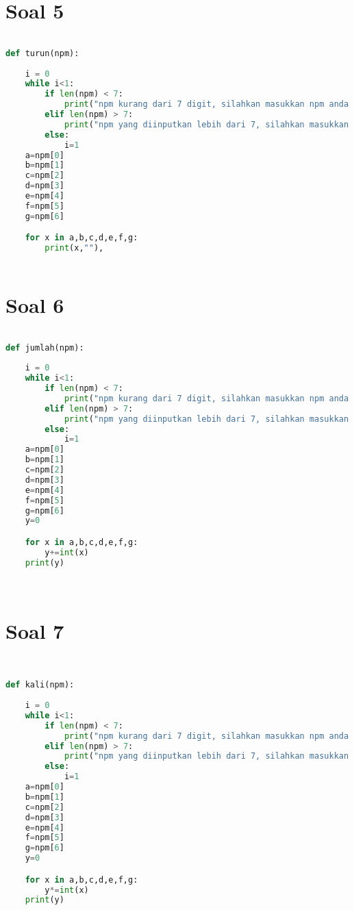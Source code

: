 \section*{Soal 5}
\begin{lstlisting}[language=Python]

def turun(npm):
    
    i = 0
    while i<1:
        if len(npm) < 7:
            print("npm kurang dari 7 digit, silahkan masukkan npm anda kembali")
        elif len(npm) > 7:
            print("npm yang diinputkan lebih dari 7, silahkan masukkan npm anda kembali")
        else:
            i=1
    a=npm[0]
    b=npm[1]
    c=npm[2]
    d=npm[3]
    e=npm[4]
    f=npm[5]
    g=npm[6]

    for x in a,b,c,d,e,f,g:
        print(x,""),



\end{lstlisting}
\section*{Soal 6}
\begin{lstlisting}[language=Python]

def jumlah(npm):
    
    i = 0
    while i<1:
        if len(npm) < 7:
            print("npm kurang dari 7 digit, silahkan masukkan npm anda kembali")
        elif len(npm) > 7:
            print("npm yang diinputkan lebih dari 7, silahkan masukkan npm anda kembali")
        else:
            i=1
    a=npm[0]
    b=npm[1]
    c=npm[2]
    d=npm[3]
    e=npm[4]
    f=npm[5]
    g=npm[6]
    y=0

    for x in a,b,c,d,e,f,g:
        y+=int(x)
    print(y)




\end{lstlisting}
\section*{Soal 7}
\begin{lstlisting}[language=Python]


def kali(npm):
    
    i = 0
    while i<1:
        if len(npm) < 7:
            print("npm kurang dari 7 digit, silahkan masukkan npm anda kembali")
        elif len(npm) > 7:
            print("npm yang diinputkan lebih dari 7, silahkan masukkan npm anda kembali")
        else:
            i=1
    a=npm[0]
    b=npm[1]
    c=npm[2]
    d=npm[3]
    e=npm[4]
    f=npm[5]
    g=npm[6]
    y=0

    for x in a,b,c,d,e,f,g:
        y*=int(x)
    print(y)

\end{lstlisting}
